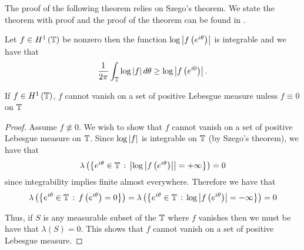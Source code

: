The proof of the following theorem relies on Szego's theorem. We state the theorem with proof and the proof of the theorem can be found in \cite{hoffman2007banach}.

\begin{theorem}
    Let $f\in H^{1} \left( \mathbb T \right)$ be nonzero then the function $\log \left\lvert f\left( e^{i\theta} \right) \right\rvert$ is integrable and we have that 
    \begin{equation*}
	\frac{1}{2\pi} \int_{\mathbb T} \log \left\lvert f \right\rvert d\theta \ge \log \left\lvert f\left( e^{i0} \right) \right\rvert.
    \end{equation*}
    \label{thm:szego-integrable-h1}
\end{theorem}

\begin{corollary}
    If $f \in H^{1} \left( \mathbb T \right)$, $f$ cannot vanish on a set of positive Lebesgue measure unless $f \equiv 0$ on $\mathbb T$
    \label{cor:H1-f-zero}
\end{corollary}
\begin{proof}
    Assume $f\not\equiv 0$. We wish to show that $f$ cannot vanish on a set of positive Lebesgue measure on $\mathbb T$. Since $\log \left\lvert f \right\rvert$ is integrable on $\mathbb T$ (by Szego's theorem), we have that 
    \begin{equation*}
	\lambda \left( \left\{ e^{i\theta} \in \mathbb T \, : \, \left\lvert \log \left\lvert f\left( e^{i\theta}  \right) \right\rvert \right\rvert  = +\infty\right\} \right) = 0
    \end{equation*}
    since integrability implies finite almost everywhere. Therefore we have that 
    \begin{equation*}
	\lambda \left( \left\{ e^{i\theta} \in \mathbb T \, : \, f\left( e^{i\theta} \right) = 0 \right\} \right) = \lambda \left( \left\{ e^{i\theta} \in \mathbb T \, : \, \log \left\lvert f\left( e^{i\theta}  \right) \right\rvert  = -\infty\right\} \right) = 0
    \end{equation*}
   
    Thus, if $S$ is any measurable subset of the $\mathbb T$ where $f$ vanishes then we must be have that $\lambda \left( S \right) = 0$. This shows that $f$ cannot vanish on a set of positive Lebesgue measure.
\end{proof}
